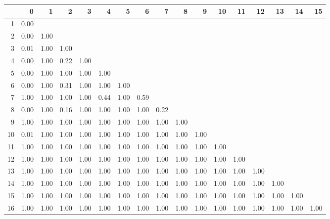 \documentclass[a4paper,headsepline,footsepline,fontsize=11pt,BCOR=12mm,DIV=12]{report}
\begin{document}
\begin{table}[h!]
	\tiny
	\centering
	\begin{tabular}{rrrrrrrrrrrrrrrrr}
		\toprule
		& 0 & 1 & 2 & 3 & 4 & 5 & 6 & 7 & 8 & 9 & 10 & 11 & 12 & 13 & 14 & 15 \\ 
		\hline
		1 & 0.00 &  &  &  &  &  &  &  &  &  &  &  &  &  &  &  \\ 
		  2 & 0.00 & 1.00 &  &  &  &  &  &  &  &  &  &  &  &  &  &  \\ 
		  3 & 0.01 & 1.00 & 1.00 &  &  &  &  &  &  &  &  &  &  &  &  &  \\ 
		  4 & 0.00 & 1.00 & 0.22 & 1.00 &  &  &  &  &  &  &  &  &  &  &  &  \\ 
		  5 & 0.00 & 1.00 & 1.00 & 1.00 & 1.00 &  &  &  &  &  &  &  &  &  &  &  \\ 
		  6 & 0.00 & 1.00 & 0.31 & 1.00 & 1.00 & 1.00 &  &  &  &  &  &  &  &  &  &  \\ 
		  7 & 1.00 & 1.00 & 1.00 & 1.00 & 0.44 & 1.00 & 0.59 &  &  &  &  &  &  &  &  &  \\ 
		  8 & 0.00 & 1.00 & 0.16 & 1.00 & 1.00 & 1.00 & 1.00 & 0.22 &  &  &  &  &  &  &  &  \\ 
		  9 & 1.00 & 1.00 & 1.00 & 1.00 & 1.00 & 1.00 & 1.00 & 1.00 & 1.00 &  &  &  &  &  &  &  \\ 
		  10 & 0.01 & 1.00 & 1.00 & 1.00 & 1.00 & 1.00 & 1.00 & 1.00 & 1.00 & 1.00 &  &  &  &  &  &  \\ 
		  11 & 1.00 & 1.00 & 1.00 & 1.00 & 1.00 & 1.00 & 1.00 & 1.00 & 1.00 & 1.00 & 1.00 &  &  &  &  &  \\ 
		  12 & 1.00 & 1.00 & 1.00 & 1.00 & 1.00 & 1.00 & 1.00 & 1.00 & 1.00 & 1.00 & 1.00 & 1.00 &  &  &  &  \\ 
		  13 & 1.00 & 1.00 & 1.00 & 1.00 & 1.00 & 1.00 & 1.00 & 1.00 & 1.00 & 1.00 & 1.00 & 1.00 & 1.00 &  &  &  \\ 
		  14 & 1.00 & 1.00 & 1.00 & 1.00 & 1.00 & 1.00 & 1.00 & 1.00 & 1.00 & 1.00 & 1.00 & 1.00 & 1.00 & 1.00 &  &  \\ 
		  15 & 1.00 & 1.00 & 1.00 & 1.00 & 1.00 & 1.00 & 1.00 & 1.00 & 1.00 & 1.00 & 1.00 & 1.00 & 1.00 & 1.00 & 1.00 &  \\ 
		  16 & 1.00 & 1.00 & 1.00 & 1.00 & 1.00 & 1.00 & 1.00 & 1.00 & 1.00 & 1.00 & 1.00 & 1.00 & 1.00 & 1.00 & 1.00 & 1.00 \\ 
		  \hline
	\end{tabular}
\end{table}
\end{document}

